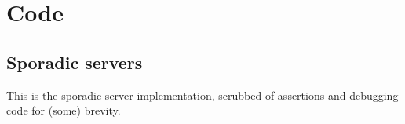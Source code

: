 \chapter{Code}
\section{Sporadic servers}
\label{sporadic-code}
This is the sporadic server implementation, scrubbed of assertions and debugging code for (some) brevity.
\inputminted{c}{code/sporadic.c}
